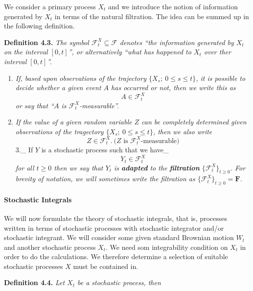 \documentclass[
]{article}
\providecommand{\tightlist}{%
  \setlength{\itemsep}{0pt}\setlength{\parskip}{0pt}}
\begin{document}
We consider a primary process \(X_t\) and we introduce the notion of
information generated by \(X_t\) in terms of the natural filtration. The
idea can be summed up in the following definition.

\textbf{Definition 4.3.} \emph{The symbol
\(\mathcal{F}^X_t\subseteq\mathcal{F}\) denotes ``the information
generated by \(X_t\) on the interval \([0,t]\)'', or alternatively
``what has happened to \(X_t\) over ther interval \([0,t]\)''.}

\begin{enumerate}
\def\labelenumi{\arabic{enumi}.}
\tightlist
\item
  \emph{If, based upon observations of the trajectory
  \(\{X_s;\ 0\le s\le t\}\), it is possible to decide whether a given
  event \(A\) has occurred or not, then we write this as} \[
    A\in\mathcal{F}^X_t
    \] \emph{or say that ``\(A\) is \(\mathcal{F}^X_t\)-measurable''.}
\item
  \emph{If the value of a given random variable \(Z\) can be completely
  determined given observations of the tragectory
  \(\{X_s;\ 0\le s\le t\}\), then we also write} \[
    Z\in\mathcal{F}^X_t.\ \text{(}Z\text{ is }\mathcal{F}^X_t\text{-measurable)}
    \] 3.\_ If \(Y\) is a stochastic process such that we have\_ \[
    Y_t\in\mathcal{F}^X_t
    \] \emph{for all \(t\ge0\) then we say that \(Y_t\) is
  \textbf{adapted} to the \textbf{filtration}
  \(\{\mathcal{F}^X_t\}_{t\ge 0}\). For brevity of notation, we will
  sometimes write the filtration as
  \(\{\mathcal{F}^X_t\}_{t\ge 0}=\mathbf{F}\).}
\end{enumerate}

\hypertarget{stochastic-integrals-1}{%
\paragraph{Stochastic Integrals}\label{stochastic-integrals-1}}

We will now formulate the theory of stochastic integrals, that is,
processes written in terms of stochastic processes with stochastic
integrator and/or stochastic integrant. We will consider some given
standard Brownian motion \(W_t\) and another stochastic process \(X_t\).
We need som integrability condition on \(X_t\) in order to do the
calculations. We therefore determine a selection of suitable stochastic
processes \(X\) must be contained in.

\textbf{Definition 4.4.} \emph{Let \(X_t\) be a stochastic process,
then}
\end{document}
